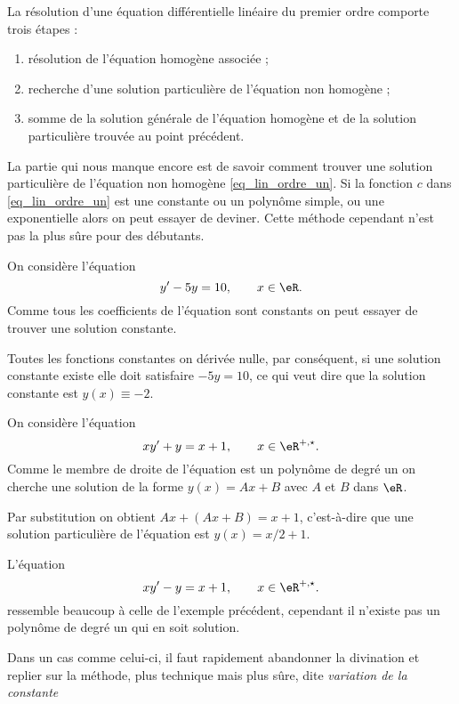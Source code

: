 \begin{Aretenir}
  La résolution d'une équation différentielle linéaire du premier ordre comporte trois étapes :
  \begin{enumerate}
  \item résolution de l'équation homogène associée ;
  \item recherche d'une solution particulière de l'équation non homogène ;
  \item somme de la solution générale de l'équation homogène et de la solution particulière trouvée au point précédent.
  \end{enumerate}
\end{Aretenir}
La partie qui nous manque encore est de savoir comment trouver une solution particulière de l'équation non homogène \eqref{eq_lin_ordre_un}. Si la fonction $c$ dans \eqref{eq_lin_ordre_un} est une constante ou un polynôme simple, ou une exponentielle alors on peut essayer de deviner. Cette méthode cependant n'est pas la plus sûre pour des débutants.

\begin{example}
  On considère l'équation
  \begin{equation}
    y'-5y = 10, \qquad x\in\eR.
  \end{equation}
Comme tous les coefficients de l'équation sont constants on peut essayer de trouver une solution constante.

Toutes les fonctions constantes on dérivée nulle, par conséquent, si une solution constante existe elle doit satisfaire $-5y = 10$, ce qui veut dire que la solution constante est $y(x)\equiv -2$.
\end{example}

\begin{example}
  On considère l'équation
  \begin{equation}
    xy'+y = x+1, \qquad x\in\eR^{+,\star}.
  \end{equation}
Comme le membre de droite de l'équation est un polynôme de degré un on cherche une solution de la forme $y(x) = Ax + B$ avec $A$ et $B$ dans $\eR$.

Par substitution on obtient $Ax + (Ax +B) = x+1$, c'est-à-dire que une solution particulière de l'équation est $y(x) = x/2+1$.
\end{example}

\begin{example}
   L'équation
  \begin{equation}
    xy'-y = x+1, \qquad x\in\eR^{+,\star}.
  \end{equation}
ressemble beaucoup à celle de l'exemple précédent, cependant il n'existe pas un polynôme de degré un qui en soit solution.

Dans un cas comme celui-ci, il faut rapidement abandonner la divination et replier sur la méthode, plus technique mais plus sûre, dite  \emph{variation de la constante}
\end{example}


